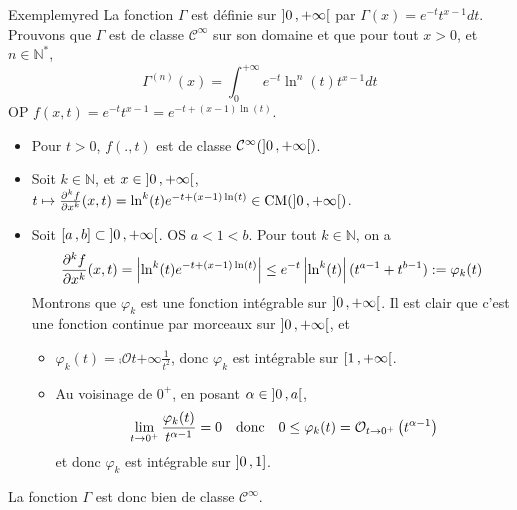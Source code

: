     \begin{omed}{Exemple}{myred}
        La fonction $\Gamma$ est définie sur $\left] 0 \, , +\infty \right[$ par $\Gamma(x) = e^{-t} t^{x-1} dt$. Prouvons que $\Gamma$ est de classe $\mathcal{C}^{\infty}$ sur son domaine et que pour tout $x > 0$, et $n \in \mathbb{N}^*$, 
        \[ \Gamma^(n)(x) = \int_{0}^{+\infty} e^{-t} \ln^n(t) t^{x-1}dt \]   
        OP $f(x,t) = e^{-t} t^{x-1} = e^{-t + (x-1)\ln(t)}$.
        \begin{itemize}
            \item Pour $t > 0$, $f(.,t)$ est de classe $\mathcal{C}^{\infty}(\left] 0 \, , +\infty \right[)$.
            \item Soit $k \in \mathbb{N}$, et $x \in \left] 0 \, , +\infty \right[$, $t \mapsto \frac{\partial^k f}{\partial x^k}(x,t) = \ln^k(t) e^{-t + (x-1) \ln(t)} \in \operatorname{CM}(\left] 0 \, , +\infty \right[)$.
            \item Soit $\left[ a \, , b \right] \subset \left] 0 \, , +\infty \right[$. OS $a < 1 < b$. Pour tout $k \in \mathbb{N}$, on a 
            \[ \frac{\partial^k f}{\partial x^k}(x,t) = \left\lvert \ln^k(t) e^{-t + (x-1)\ln(t)}\right\rvert \leq e^{-t} \left\lvert \ln^k(t)\right\rvert (t^{a-1} + t^{b-1}) := \varphi_k(t) \]    
            Montrons que $\varphi_k$ est une fonction intégrable sur $\left] 0 \, , +\infty \right[$. Il est clair que c’est une fonction continue par morceaux sur $\left] 0 \, , +\infty \right[$, et 
            \begin{itemize}
                \item $\varphi_k(t) = \comp{\mathcal{O}}{t}{+\infty}{\frac{1}{t^2}}$, donc $\varphi_k$ est intégrable sur $\left[ 1 \, , +\infty \right[$.
                \item Au voisinage de $0^+$, en posant $\alpha \in \left] 0 \, , a \right[$, 
                \[ \lim_{t \to 0^+} \frac{\varphi_k(t)}{t^{\alpha - 1}} = 0 \quad \text{donc} \quad 0 \leq \varphi_k(t) = \mathcal{O}_{t \rightarrow 0^+} \left(t^{\alpha-1}\right) \]   
                et donc $\varphi_k$ est intégrable sur $\left] 0 \, , 1 \right]$.
            \end{itemize}
        \end{itemize}
        La fonction $\Gamma$ est donc bien de classe $\mathcal{C}^{\infty}$.
    \end{omed}

